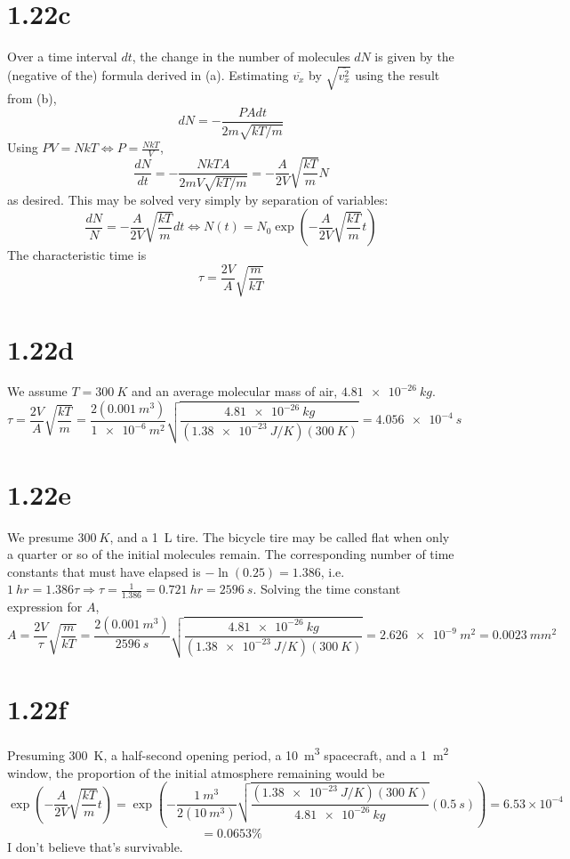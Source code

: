 \documentclass{article}
\begin{document}
\section*{1.22c}
Over a time interval $dt$, the change in the number of molecules $dN$ is given by the (negative of the) formula derived in (a). Estimating $\overline{v_x}$ by $\sqrt{\overline{v_x^2}}$ using the result from (b),
\[dN=-\frac{PAdt}{2m\sqrt{kT/m}}\]
Using $PV=NkT\Leftrightarrow P=\frac{NkT}{V}$,
\[\frac{dN}{dt}=-\frac{NkTA}{2mV\sqrt{kT/m}}=-\frac{A}{2V}\sqrt{\frac{kT}{m}}N\]
as desired. This may be solved very simply by separation of variables:
\[\frac{dN}{N}=-\frac{A}{2V}\sqrt{\frac{kT}{m}}dt\Leftrightarrow N(t)=N_0\exp\left( -\frac{A}{2V}\sqrt{\frac{kT}{m}}t \right)\]
The characteristic time is
\[\tau=\frac{2V}{A}\sqrt{\frac{m}{kT}}\]

\section*{1.22d}
We assume $T=\SI{300}{K}$ and an average molecular mass of air, $\SI{4.81e-26}{kg}$.
\[\tau=\frac{2V}{A}\sqrt{\frac{kT}{m}}=\frac{2(\SI{0.001}{m^3})}{\SI{1e-6}{m^2}}\sqrt{\frac{\SI{4.81e-26}{kg}}{(\SI{1.38e-23}{J/K})(\SI{300}{K})}}=\SI{4.056e-4}{s}\]

\section*{1.22e}
We presume $\SI{300}{K}$, and a \SI{1}{L} tire. The bicycle tire may be called flat when only a quarter or so of the initial molecules remain. The corresponding number of time constants that must have elapsed is $-\ln(0.25)=1.386$, i.e. $\SI{1}{hr}=1.386\tau\Rightarrow \tau=\frac{1}{1.386}=\SI{0.721}{hr}=\SI{2596}{s}$.
Solving the time constant expression for $A$,
\[A=\frac{2V}{\tau}\sqrt{\frac{m}{kT}}=\frac{2(\SI{0.001}{m^3})}{\SI{2596}{s}}\sqrt{\frac{\SI{4.81e-26}{kg}}{(\SI{1.38e-23}{J/K})(\SI{300}{K})}}=\SI{2.626e-9}{m^2}=\SI{0.0023}{mm^2}\]

\section*{1.22f}
Presuming \SI{300}{K}, a half-second opening period, a \SI{10}{m^3} spacecraft, and a \SI{1}{m^2} window, the proportion of the initial atmosphere remaining would be
\[\exp\left(-\frac{A}{2V}\sqrt{\frac{kT}{m}}t \right)=\exp\left(- \frac{\SI{1}{m^3}}{2(\SI{10}{m^3})}\sqrt{\frac{(\SI{1.38e-23}{J/K})(\SI{300}{K})}{\SI{4.81e-26}{kg}}}(\SI{0.5}{s}) \right)={6.53}\times10^{-4}\]
\[=0.0653\%\]
I don't believe that's survivable.
\end{document}
